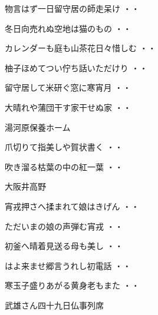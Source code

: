 \begin{shiika}物言はず一日留守居の師走呆け
\hfill{・・}\end{shiika}
\begin{shiika}冬日向売れぬ空地は猫のもの
\hfill{・・}\end{shiika}
\begin{shiika}カレンダーも庭も山茶花日々惜しむ
\hfill{・・}\end{shiika}
\begin{shiika}柚子ほめてつい佇ち話いただけり
\hfill{・・}\end{shiika}
\begin{shiika}留守居して米研ぐ窓に寒宵月
\hfill{・・}\end{shiika}
\begin{shiika}大晴れや蒲団干す家干せぬ家
\hfill{・・}\end{shiika}
\vspace{0.4cm}
湯河原保養ホーム
\begin{shiika}爪切りて指美しや賀状書く
\hfill{・・}\end{shiika}
\begin{shiika}吹き溜る枯葉の中の紅一葉
\hfill{・・}\end{shiika}
\vspace{0.4cm}
大阪井高野
\begin{shiika}宵戎押さへ揉まれて娘はきげん
\hfill{・・}\end{shiika}
\begin{shiika}ただいまの娘の声弾む宵戎
\hfill{・・}\end{shiika}
\begin{shiika}初釜へ晴着見送る母も美し
\hfill{・・}\end{shiika}
\begin{shiika}はよ来ませ郷言うれし初電話
\hfill{・・}\end{shiika}
\begin{shiika}寒玉子盛りあがる黄身老もまた
\hfill{・・}\end{shiika}
\vspace{0.4cm}
武雄さん四十九日仏事列席
